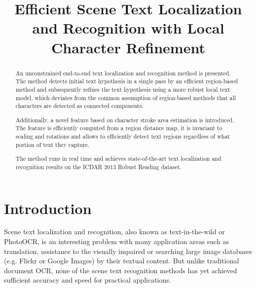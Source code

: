 \documentclass[conference]{IEEEtran}
\begin{document}
\title{Efficient Scene Text Localization and Recognition with Local Character Refinement \vspace{-10pt}}

\author{
\and
{}
}

\vspace{-15pt}


\maketitle


\begin{abstract}
An unconstrained end-to-end text localization and recognition method is presented. The method detects initial text hypothesis in a single pass by an efficient region-based method and subsequently refines the text hypothesis using a more robust local text model, which deviates from the common assumption of region-based methods that all characters are detected as connected components.

Additionally, a novel feature based on character stroke area estimation is introduced. The feature is efficiently computed from a region distance map, it is invariant to scaling and rotations and allows to efficiently detect text regions regardless of what portion of text they capture.

The method runs in real time and achieves state-of-the-art text localization and recognition results on the ICDAR 2013 Robust Reading dataset.
\vspace{-10pt}
\end{abstract}







\IEEEpeerreviewmaketitle



\section{Introduction}
Scene text localization and recognition, also known as text-in-the-wild or PhotoOCR, is an interesting problem with many application areas such as translation, assistance to the visually impaired or searching large image databases (e.g. Flickr or Google Images) by their textual content. But unlike traditional document OCR, none of the scene text recognition methods has yet achieved sufficient accuracy and speed for practical applications.
\end{document}
